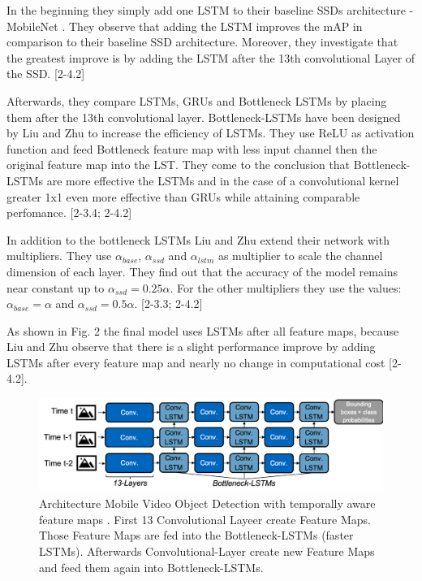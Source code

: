 \documentclass[conference]{IEEEtran}
\begin{document}
In the beginning they simply add one LSTM to their baseline SSDs architecture - MobileNet \cite{b24}. They observe that adding the LSTM improves the mAP in comparison to their baseline SSD architecture. Moreover, they investigate that the greatest improve is by adding the LSTM after the 13th convolutional Layer of the SSD. [2-4.2] \newline

Afterwards, they compare LSTMs, GRUs and Bottleneck LSTMs by placing them after the 13th convolutional layer. Bottleneck-LSTMs have been designed by Liu and Zhu to increase the efficiency of LSTMs. They use ReLU as activation function and feed Bottleneck feature map with less input channel then the original feature map into the LST. They come to the conclusion that Bottleneck-LSTMs are more effective the LSTMs and in the case of a convolutional kernel greater 1x1 even more effective than GRUs while attaining comparable perfomance. [2-3.4; 2-4.2]\newline

In addition to the bottleneck LSTMs Liu and Zhu extend their network with multipliers. They use $\alpha_{base}$, $\alpha_{ssd}$ and $\alpha_{lstm}$ as multiplier to scale the channel dimension of each layer. They find out that the accuracy of the model remains near constant up to $\alpha_{ssd}= 0.25 \alpha$. For the other multipliers they use the values: $\alpha_{base} = \alpha$ and $\alpha_{ssd} = 0.5 \alpha$. [2-3.3; 2-4.2] \newline

As shown in Fig. 2 the final model uses LSTMs after all feature maps, because Liu and Zhu observe that there is a slight performance improve by adding LSTMs after every feature map and nearly no change in computational cost [2-4.2].

\begin{figure} [h]
\includegraphics[width=\columnwidth]{Liu_Zhu}
\caption{Architecture Mobile Video Object Detection with temporally aware feature maps \cite{b2}. First 13 Convolutional Layeer create Feature Maps. Those Feature Maps are fed into the Bottleneck-LSTMs (faster LSTMs). Afterwards Convolutional-Layer create new Feature Maps and feed them again into Bottleneck-LSTMs.}
\end{figure}
\end{document}
